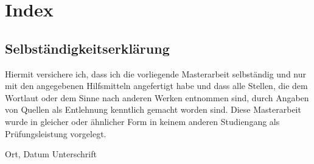 \documentclass[twoside,12pt,a4paper]{report}
\begin{document}
\chapter*{Index}
\cleardoublepage






\cleardoublepage
\thispagestyle{empty}
\section*{Selbst\"andigkeitserkl\"arung}

Hiermit versichere ich, dass ich die vorliegende Masterarbeit 
selbst\"andig und nur mit den angegebenen Hilfsmitteln angefertigt habe und dass alle Stellen, die dem Wortlaut oder dem 
Sinne nach anderen Werken entnommen sind, durch Angaben von Quellen als 
Entlehnung kenntlich gemacht worden sind. 
Diese Masterarbeit wurde in gleicher oder \"ahnlicher Form in keinem anderen 
Studiengang als Pr\"ufungsleistung vorgelegt. 

\vskip 3cm

Ort, Datum	\hfill Unterschrift \hfill 
\end{document}
